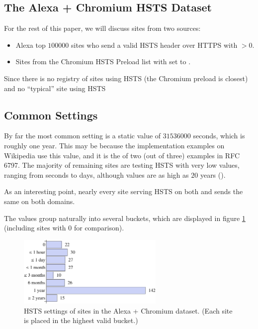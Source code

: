 \documentclass{acm_proc_article-sp}
\begin{document}
{\subsection{The Alexa + Chromium HSTS Dataset}

For the rest of this paper, we will discuss sites from two sources:

\begin{itemize}
\item Alexa top $100000$ sites who send a valid HSTS header over HTTPS with {\ma}$ > 0$.
\item Sites from the Chromium HSTS Preload list with  set to .
\end{itemize}

Since there is no registry of sites using HSTS (the Chromium preload is closest) and no ``typical'' site using HSTS

\subsection{Common  Settings}

By far the most common {\ma} setting is a static value of $31536000$ seconds, which is roughly one year. This may be because the implementation examples on Wikipedia use this value\cite{wiki}, and it is the {\ma} of two (out of three) examples in RFC 6797\cite{rfc}. The majority of remaining sites are testing HSTS with very low values, ranging from seconds to days, although {\ma} values are as high as $20$ years ().

As an interesting point, nearly every site serving HSTS on both {\s} and {\sw} sends the same {\ma} on both domains.

The {\ma} values group naturally into several buckets, which are displayed in figure \ref{fig:max-age} (including sites with {\ma} $0$ for comparison).

\begin{figure}[h!]
\begin{center}
\includegraphics[width=70mm]{max-age.pdf}
\caption{HSTS  settings of sites in the Alexa + Chromium dataset. (Each site is placed in the highest valid bucket.)}
\label{fig:max-age}
\end{center}
\end{figure}
 

}
\end{document}

